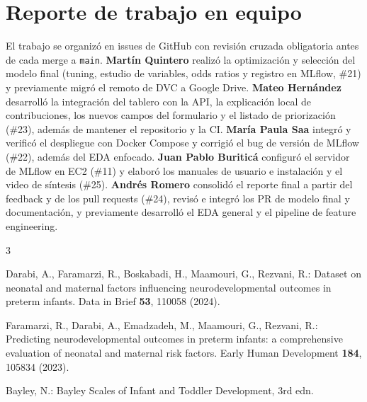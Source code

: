 \documentclass{llncs}
\begin{document}
\section{Reporte de trabajo en equipo}

El trabajo se organizó en issues de GitHub con revisión cruzada obligatoria
antes de cada merge a \texttt{main}.
\textbf{Martín Quintero} realizó la optimización y selección del modelo final
(tuning, estudio de variables, odds ratios y registro en MLflow, \#21) y
previamente migró el remoto de DVC a Google Drive.
\textbf{Mateo Hernández} desarrolló la integración del tablero con la API, la
explicación local de contribuciones, los nuevos campos del formulario y el
listado de priorización (\#23), además de mantener el repositorio y la CI.
\textbf{María Paula Saa} integró y verificó el despliegue con Docker Compose y
corrigió el bug de versión de MLflow (\#22), además del EDA enfocado.
\textbf{Juan Pablo Buriticá} configuró el servidor de MLflow en EC2 (\#11) y
elaboró los manuales de usuario e instalación y el video de síntesis (\#25).
\textbf{Andrés Romero} consolidó el reporte final a partir del feedback y de los
pull requests (\#24), revisó e integró los PR de modelo final y documentación,
y previamente desarrolló el EDA general y el pipeline de feature engineering.

\begin{thebibliography}{3}

Darabi, A., Faramarzi, R., Boskabadi, H., Maamouri, G., Rezvani, R.:
Dataset on neonatal and maternal factors influencing neurodevelopmental outcomes
in preterm infants. Data in Brief \textbf{53}, 110058 (2024).

Faramarzi, R., Darabi, A., Emadzadeh, M., Maamouri, G., Rezvani, R.:
Predicting neurodevelopmental outcomes in preterm infants: a comprehensive
evaluation of neonatal and maternal risk factors. Early Human Development
\textbf{184}, 105834 (2023).

Bayley, N.: Bayley Scales of Infant and Toddler Development, 3rd edn.

\end{thebibliography}
\end{document}
